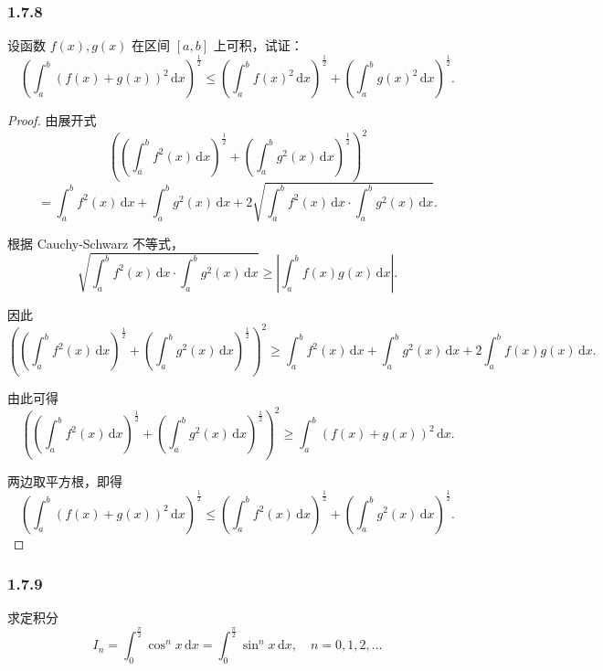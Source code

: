 \documentclass[12pt]{ctexart}
\begin{document}
\subsubsection*{1.7.8}

设函数 $f(x), g(x)$ 在区间 $[a, b]$ 上可积，试证：
\[
\left( \int_{a}^{b} \left( f(x) + g(x) \right)^2 \, \mathrm{d}x \right)^{\frac{1}{2}} \leq 
\left( \int_{a}^{b} f(x)^2 \, \mathrm{d}x \right)^{\frac{1}{2}} + \left( \int_{a}^{b} g(x)^2 \, \mathrm{d}x \right)^{\frac{1}{2}}.
\]
\begin{proof}
由展开式
\[
\left( \left( \int_{a}^{b} f^2(x) \, \mathrm{d}x \right)^{\frac{1}{2}} + \left( \int_{a}^{b} g^2(x) \, \mathrm{d}x \right)^{\frac{1}{2}} \right)^2 
\]
\[
= \int_{a}^{b} f^2(x) \, \mathrm{d}x + \int_{a}^{b} g^2(x) \, \mathrm{d}x + 2 \sqrt{\int_{a}^{b} f^2(x) \, \mathrm{d}x \cdot \int_{a}^{b} g^2(x) \, \mathrm{d}x}.
\]

根据 Cauchy-Schwarz 不等式，
\[
\sqrt{\int_{a}^{b} f^2(x) \, \mathrm{d}x \cdot \int_{a}^{b} g^2(x) \, \mathrm{d}x} \geq \left| \int_{a}^{b} f(x) g(x) \, \mathrm{d}x \right|.
\]

因此
\[
\left( \left( \int_{a}^{b} f^2(x) \, \mathrm{d}x \right)^{\frac{1}{2}} + \left( \int_{a}^{b} g^2(x) \, \mathrm{d}x \right)^{\frac{1}{2}} \right)^2 
\geq \int_{a}^{b} f^2(x) \, \mathrm{d}x + \int_{a}^{b} g^2(x) \, \mathrm{d}x + 2 \int_{a}^{b} f(x) g(x) \, \mathrm{d}x.
\]

由此可得
\[
\left( \left( \int_{a}^{b} f^2(x) \, \mathrm{d}x \right)^{\frac{1}{2}} + \left( \int_{a}^{b} g^2(x) \, \mathrm{d}x \right)^{\frac{1}{2}} \right)^2 
\geq \int_{a}^{b} \left( f(x) + g(x) \right)^2 \, \mathrm{d}x.
\]

两边取平方根，即得
\[
\left( \int_{a}^{b} \left( f(x) + g(x) \right)^2 \, \mathrm{d}x \right)^{\frac{1}{2}} 
\leq \left( \int_{a}^{b} f^2(x) \, \mathrm{d}x \right)^{\frac{1}{2}} + \left( \int_{a}^{b} g^2(x) \, \mathrm{d}x \right)^{\frac{1}{2}}.
\]
\end{proof}

\subsubsection*{1.7.9}

求定积分
\[
I_n = \int_{0}^{\frac{\pi}{2}} \cos^n x \, \mathrm{d}x = \int_{0}^{\frac{\pi}{2}} \sin^n x \, \mathrm{d}x, \quad n = 0, 1, 2, \dots
\]
\end{document}
